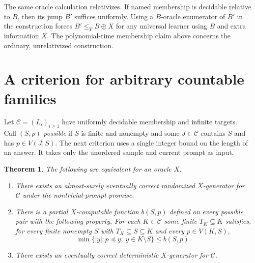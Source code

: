 \documentclass[11pt]{article}
\newtheorem{theorem}{Theorem}
\begin{document}
The same oracle calculation relativizes. If named membership is decidable relative to $B$, then its jump $B'$ suffices uniformly. Using a $B$-oracle enumerator of $B'$ in the construction forces $B'\le_T B\oplus X$ for any universal learner using $B$ and extra information $X$. The polynomial-time membership claim above concerns the ordinary, unrelativized construction.

\section{A criterion for arbitrary countable families}
Let $\mathcal C=(L_i)_{i\ge1}$ have uniformly decidable membership and infinite targets. Call $(S,p)$ \emph{possible} if $S$ is finite and nonempty and some $J\in\mathcal C$ contains $S$ and has $p\in V(J,S)$. The next criterion uses a single integer bound on the length of an answer. It takes only the unordered sample and current prompt as input.

\begin{theorem}\label{criterion}
The following are equivalent for an oracle $X$.
\begin{enumerate}
\item There exists an almost-surely eventually correct randomized $X$-generator for $\mathcal C$ under the nontrivial-prompt promise.
\item There is a partial $X$-computable function $b(S,p)$ defined on every possible pair with the following property. For each $K\in\mathcal C$ some finite $T_K\subseteq K$ satisfies, for every finite nonempty $S$ with $T_K\subseteq S\subseteq K$ and every $p\in V(K,S)$,
\[
        \min\{|y|:p\preceq y,\ y\in K\setminus S\}\le b(S,p).
\]
\item There exists an eventually correct deterministic $X$-generator for $\mathcal C$.
\end{enumerate}
\end{theorem}
\end{document}
